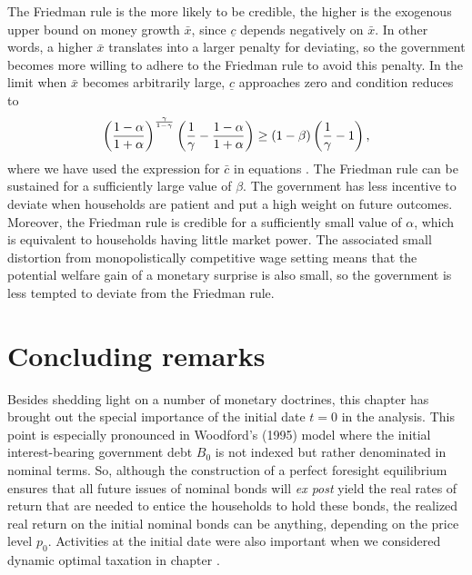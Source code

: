 The Friedman rule is the more likely to be credible,
the higher is the exogenous upper bound on money growth $\bar x$,
since $\underline c$ depends negatively on $\bar x$. In other words,
a higher $\bar x$ translates into a larger penalty for deviating,
so the government becomes more willing to adhere to the Friedman
rule to avoid this penalty. In the limit when $\bar x$ becomes
arbitrarily large, $\underline c$ approaches zero and condition
 reduces to
$$
\left({1-\alpha \over 1+\alpha}\right)^{\gamma \over 1-\gamma}
\left( {1 \over \gamma} - {1-\alpha \over 1+\alpha} \right)
\geq (1-\beta) \left( {1 \over \gamma} -1\right),
$$
where we have used the expression for $\bar c$ in equations .
The Friedman rule can be sustained for a
sufficiently large value of $\beta$. The government has less incentive
to deviate when households are patient and put a high weight on future
outcomes. Moreover, the Friedman rule is credible for
a sufficiently small value of $\alpha$, which is equivalent to
households having little market power. The associated small distortion from
monopolistically competitive wage setting means that the potential welfare gain
of a monetary surprise is also small, so the government is less
tempted to deviate from the Friedman rule.




\section{Concluding remarks}
Besides shedding light on a number of monetary doctrines, this chapter
has brought out the special importance of the initial date $t=0$
in the analysis. This point is especially pronounced in Woodford's (1995)
model where the initial interest-bearing government debt $B_0$ is
not indexed but rather denominated in nominal terms. So, although
the construction
of a perfect foresight equilibrium ensures that all future issues of nominal
bonds will {\it ex post} yield the real rates of return that are needed to
entice the households to hold these bonds, the realized real return on
the initial nominal bonds can be anything, depending on the price level
$p_0$. Activities at the initial date were also
important when we considered dynamic optimal taxation in chapter
.


